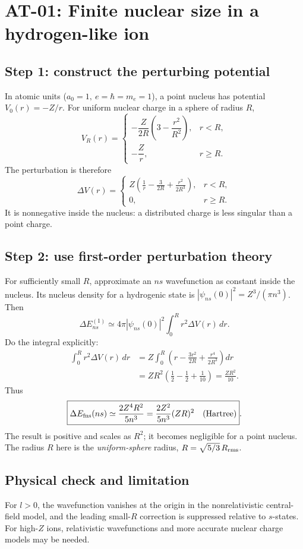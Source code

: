 
\section{AT-01: Finite nuclear size in a hydrogen-like ion}
\subsection*{Step 1: construct the perturbing potential}
In atomic units (\(a_0=1,\ e=\hbar=m_e=1\)),
a point nucleus has potential \(V_0(r)=-Z/r\).
For uniform nuclear charge in a sphere of radius \(R\),
\[
V_R(r)=
\begin{cases}
-\dfrac{Z}{2R}\left(3-\dfrac{r^2}{R^2}\right),&r<R,\\[1mm]
-\dfrac Zr,&r\ge R .
\end{cases}
\]
The perturbation is therefore
\[
\Delta V(r)=
\begin{cases}
\displaystyle Z\!\left(\frac1r-\frac{3}{2R}
+\frac{r^2}{2R^3}\right),&r<R,\\
0,&r\ge R .
\end{cases}
\]
It is nonnegative inside the nucleus: a distributed
charge is less singular than a point charge.

\subsection*{Step 2: use first-order perturbation theory}
For sufficiently small \(R\), approximate an \(ns\)
wavefunction as constant inside the nucleus.
Its nucleus density for a hydrogenic state is
\(|\psi_{ns}(0)|^2=Z^3/(\pi n^3)\).
Then
\[
\Delta E_{ns}^{(1)}
\simeq4\pi|\psi_{ns}(0)|^2
\int_0^R r^2\Delta V(r)\,dr .
\]
Do the integral explicitly:
\begin{align*}
\int_0^R r^2\Delta V(r)\,dr
&=Z\int_0^R
\left(r-\frac{3r^2}{2R}+\frac{r^4}{2R^3}\right)dr\\
&=ZR^2\left(\frac12-\frac12+\frac1{10}\right)
=\frac{ZR^2}{10}.
\end{align*}
Thus
\[
\boxed{\Delta E_{\rm fns}(ns)\simeq
\frac{2Z^4R^2}{5n^3}
=\frac{2Z^2}{5n^3}(ZR)^2\quad\text{(Hartree)}}.
\]
The result is positive and scales as \(R^2\);
it becomes negligible for a point nucleus.
The radius \(R\) here is the \emph{uniform-sphere} radius,
\(R=\sqrt{5/3}\,R_{\rm rms}\).

\subsection*{Physical check and limitation}
For \(l>0\), the wavefunction vanishes at the origin in
the nonrelativistic central-field model, and the leading
small-\(R\) correction is suppressed relative to \(s\)-states.
For high-\(Z\) ions, relativistic wavefunctions and more
accurate nuclear charge models may be needed.
